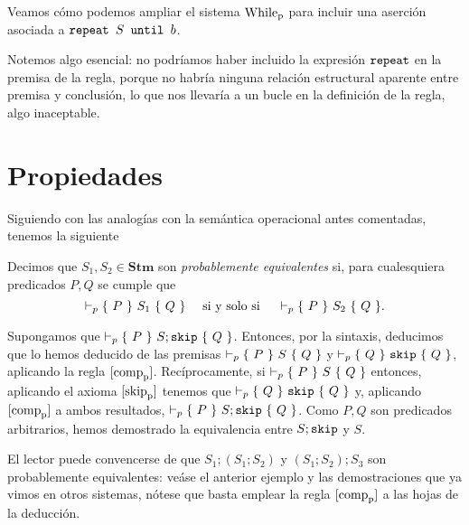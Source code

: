 \begin{example}
Veamos cómo podemos ampliar el sistema $\nn{While}_\nn{p}$ para incluir una aserción asociada a $\n{repeat }S\n{ until }b$.
\begin{prooftree}
\end{prooftree}
Notemos algo esencial: no podríamos haber incluido la expresión $\n{repeat}$ en la premisa de la regla, porque no habría ninguna relación estructural aparente entre premisa y conclusión, lo que nos llevaría a un bucle en la definición de la regla, algo inaceptable.
\end{example}

\section{Propiedades}

Siguiendo con las analogías con la semántica operacional antes comentadas, tenemos la siguiente
\begin{definition}
Decimos que $S_1, S_2 \in \mathbf{Stm}$ son \textit{probablemente equivalentes} si, para cualesquiera predicados $P, Q$ se cumple que
$$\vdash_p \pre{P}{S_1}{Q} \quad \text{ si y solo si } \quad \vdash_p \pre{P}{S_2}{Q}.$$
\end{definition}


\begin{example}
Supongamos que $\vdash_p \pre{P}{S;\n{skip}}{Q}$. Entonces, por la sintaxis, deducimos que lo hemos deducido de las premisas $\vdash_p \pre{P}{S}{Q}$ y $\vdash_p \pre{Q}{\n{skip}}{Q}$, aplicando la regla $[\text{comp}_{\nn{p}}]$. Recíprocamente, si $\vdash_p \pre{P}{S}{Q}$ entonces, aplicando el axioma $[\text{skip}_{\nn{p}}]$ tenemos que $\vdash_p \pre{Q}{\n{skip}}{Q}$ y, aplicando $[\text{comp}_{\nn{p}}]$ a ambos resultados, $\vdash_p \pre{P}{S;\n{skip}}{Q}$. Como $P, Q$ son predicados arbitrarios, hemos demostrado la equivalencia entre $S;\n{skip}$ y $S$.
\end{example}

\begin{example}
El lector puede convencerse de que $S_1;(S_1;S_2)$ y $(S_1;S_2);S_3$ son probablemente equivalentes: veáse el anterior ejemplo y las demostraciones que ya vimos en otros sistemas, nótese que basta emplear la regla $[\text{comp}_{\nn{p}}]$ a las hojas de la deducción.
\end{example}

